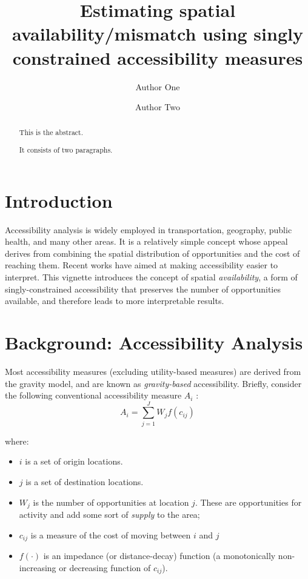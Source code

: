 \documentclass[]{elsarticle} %
\providecommand{\tightlist}{%
  \setlength{\itemsep}{0pt}\setlength{\parskip}{0pt}}
\begin{document}
\begin{frontmatter}

  \title{Estimating spatial availability/mismatch using singly
constrained accessibility measures}
    \author[Some School]{Author One}
    \author[Some School]{Author Two}
      \address[Some School]{Address}
  
  \begin{abstract}
  This is the abstract.

  It consists of two paragraphs.
  \end{abstract}
  
 \end{frontmatter}

\newpage

\hypertarget{introduction}{%
\section{Introduction}\label{introduction}}

Accessibility analysis is widely employed in transportation, geography,
public health, and many other areas. It is a relatively simple concept
whose appeal derives from combining the spatial distribution of
opportunities and the cost of reaching them. Recent works have aimed at
making accessibility easier to interpret. This vignette introduces the
concept of spatial \emph{availability}, a form of singly-constrained
accessibility that preserves the number of opportunities available, and
therefore leads to more interpretable results.

\hypertarget{background-accessibility-analysis}{%
\section{Background: Accessibility
Analysis}\label{background-accessibility-analysis}}

Most accessibility measures (excluding utility-based measures) are
derived from the gravity model, and are known as \emph{gravity-based}
accessibility. Briefly, consider the following conventional
accessibility measure \(A_i\) : \[
A_i = \sum_{j=1}^JW_jf(c_{ij})
\]

\noindent where:

\begin{itemize}
\tightlist
\item
  \(i\) is a set of origin locations.
\item
  \(j\) is a set of destination locations.
\item
  \(W_j\) is the number of opportunities at location \(j\). These are
  opportunities for activity and add some sort of \emph{supply} to the
  area;
\item
  \(c_{ij}\) is a measure of the cost of moving between \(i\) and \(j\)
\item
  \(f(\cdot)\) is an impedance (or distance-decay) function (a
  monotonically non-increasing or decreasing function of \(c_{ij}\)).
\end{itemize}
\end{document}
